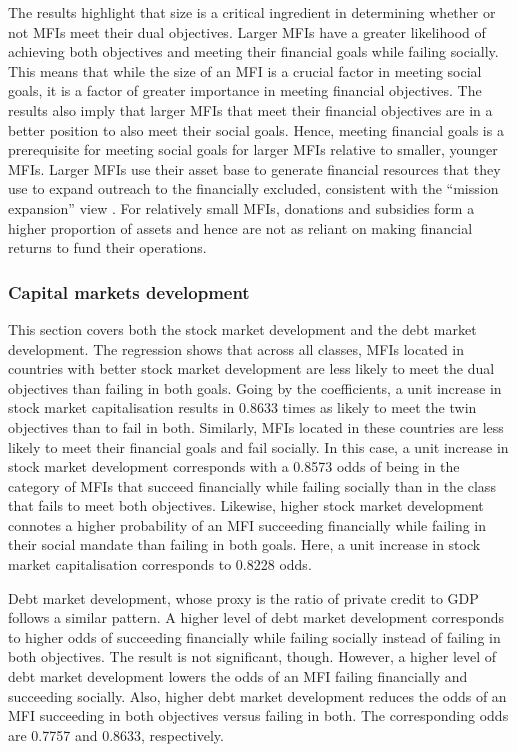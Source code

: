 \documentclass[a4paper, nobind]{templates/ociamthesis}
\begin{document}
The results highlight that size is a critical ingredient in determining whether or not MFIs meet their dual objectives. Larger MFIs have a greater likelihood of achieving both objectives and meeting their financial goals while failing socially. This means that while the size of an MFI is a crucial factor in meeting social goals, it is a factor of greater importance in meeting financial objectives. The results also imply that larger MFIs that meet their financial objectives are in a better position to also meet their social goals. Hence, meeting financial goals is a prerequisite for meeting social goals for larger MFIs relative to smaller, younger MFIs. Larger MFIs use their asset base to generate financial resources that they use to expand outreach to the financially excluded, consistent with the ``mission expansion'' view \autocite{mersland2010microfinance}. For relatively small MFIs, donations and subsidies form a higher proportion of assets and hence are not as reliant on making financial returns to fund their operations.

\hypertarget{capital-markets-development}{%
\subsubsection{Capital markets development}\label{capital-markets-development}}

This section covers both the stock market development and the debt market development. The regression shows that across all classes, MFIs located in countries with better stock market development are less likely to meet the dual objectives than failing in both goals. Going by the coefficients, a unit increase in stock market capitalisation results in 0.8633 times as likely to meet the twin objectives than to fail in both. Similarly, MFIs located in these countries are less likely to meet their financial goals and fail socially. In this case, a unit increase in stock market development corresponds with a 0.8573 odds of being in the category of MFIs that succeed financially while failing socially than in the class that fails to meet both objectives. Likewise, higher stock market development connotes a higher probability of an MFI succeeding financially while failing in their social mandate than failing in both goals. Here, a unit increase in stock market capitalisation corresponds to 0.8228 odds.

Debt market development, whose proxy is the ratio of private credit to GDP follows a similar pattern. A higher level of debt market development corresponds to higher odds of succeeding financially while failing socially instead of failing in both objectives. The result is not significant, though. However, a higher level of debt market development lowers the odds of an MFI failing financially and succeeding socially. Also, higher debt market development reduces the odds of an MFI succeeding in both objectives versus failing in both. The corresponding odds are 0.7757 and 0.8633, respectively.
\end{document}
